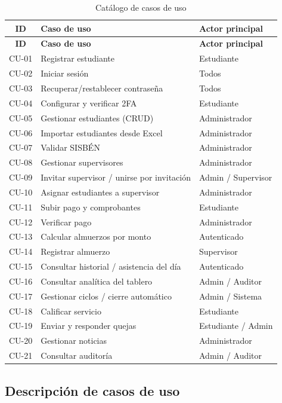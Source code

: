 \documentclass[stu,11pt,floatsintext]{apa7}
\begin{document}
\begin{longtable}{c L{0.55\textwidth} L{0.28\textwidth}}
\caption{Catálogo de casos de uso}\label{tab:catalogo}\\
\toprule
\textbf{ID} & \textbf{Caso de uso} & \textbf{Actor principal} \\
\midrule
\endfirsthead
\toprule
\textbf{ID} & \textbf{Caso de uso} & \textbf{Actor principal} \\
\midrule
\endhead
\bottomrule
\endlastfoot
CU-01 & Registrar estudiante & Estudiante \\
CU-02 & Iniciar sesión & Todos \\
CU-03 & Recuperar/restablecer contraseña & Todos \\
CU-04 & Configurar y verificar 2FA & Estudiante \\
CU-05 & Gestionar estudiantes (CRUD) & Administrador \\
CU-06 & Importar estudiantes desde Excel & Administrador \\
CU-07 & Validar SISBÉN & Administrador \\
CU-08 & Gestionar supervisores & Administrador \\
CU-09 & Invitar supervisor / unirse por invitación & Admin / Supervisor \\
CU-10 & Asignar estudiantes a supervisor & Administrador \\
CU-11 & Subir pago y comprobantes & Estudiante \\
CU-12 & Verificar pago & Administrador \\
CU-13 & Calcular almuerzos por monto & Autenticado \\
CU-14 & Registrar almuerzo & Supervisor \\
CU-15 & Consultar historial / asistencia del día & Autenticado \\
CU-16 & Consultar analítica del tablero & Admin / Auditor \\
CU-17 & Gestionar ciclos / cierre automático & Admin / Sistema \\
CU-18 & Calificar servicio & Estudiante \\
CU-19 & Enviar y responder quejas & Estudiante / Admin \\
CU-20 & Gestionar noticias & Administrador \\
CU-21 & Consultar auditoría & Admin / Auditor \\
\end{longtable}

\subsection{Descripción de casos de uso}

\end{document}
